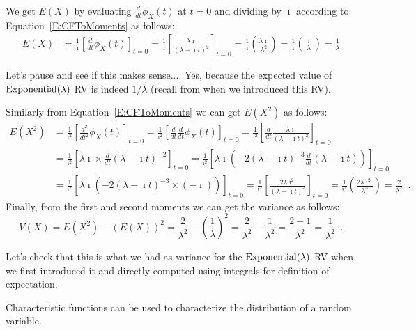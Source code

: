 \begin{example}
We get $E(X)$ by evaluating $\frac{d}{dt}\phi_X(t)$ at $t=0$ and dividing by $\imath$ according to Equation~\eqref{E:CFToMoments} as follows:
\begin{align*}
E(X)
&= \frac{1}{\imath} \left[ \frac{d}{dt}\phi_X(t) \right]_{t=0} 
= \frac{1}{\imath} \left[ \frac{\lambda \imath}{(\lambda-\imath t)^{2}} \right]_{t=0} 
= \frac{1}{\imath} \left( \frac{\lambda \imath}{\lambda^{2}} \right) 
= \frac{1}{\imath} \left( \frac{\imath}{\lambda} \right) 
=  \frac{1}{\lambda} 
\end{align*}

Let's pause and see if this makes sense.... Yes, because the expected value of $\mbox{{\rm Exponential}}(\lambda)$ RV is indeed $1/\lambda$ (recall from when we introduced this RV).

Similarly from Equation~\eqref{E:CFToMoments} we can get $E(X^2)$ as follows:
\begin{align*}
E(X^2)
&= \frac{1}{\imath^2} \left[ \frac{d^2}{dt^2}\phi_X(t) \right]_{t=0} 
= \frac{1}{\imath^2} \left[ \frac{d}{dt} \frac{d}{dt} \phi_X(t) \right]_{t=0} 
= \frac{1}{\imath^2} \left[ \frac{d}{dt} \frac{\lambda \imath}{(\lambda-\imath t)^{2}} \right]_{t=0} \\
&= \frac{1}{\imath^2} \left[ \lambda \imath \times \frac{d}{dt} {(\lambda-\imath t)^{-2}} \right]_{t=0} 
= \frac{1}{\imath^2} \left[ \lambda \imath \left( -2(\lambda-\imath t)^{-3} \frac{d}{dt} {(\lambda-\imath t)} \right) \right]_{t=0}\\ 
&= \frac{1}{\imath^2} \left[ \lambda \imath \left( -2(\lambda-\imath t)^{-3} \times (-\imath ) \right) \right]_{t=0}
= \frac{1}{\imath^2} \left[ \frac{2 \lambda \imath^2}{(\lambda-\imath t)^{3}} \right]_{t=0}
= \frac{1}{\imath^2} \left( \frac{2 \lambda \imath^2}{\lambda^{3}} \right) 
=  \frac{2}{\lambda^{2}}\enspace.
\end{align*}
Finally, from the first and second moments we can get the variance as follows:
\[
V(X) = E(X^2) - (E(X))^2 = \frac{2}{\lambda^2} - \left(\frac{1}{\lambda}\right)^2  = \frac{2}{\lambda^2} - \frac{1}{\lambda^2} = \frac{2-1}{\lambda^2} = \frac{1}{\lambda^2}   \enspace .
\]

Let's check that this is what we had as variance for the $\mbox{{\rm Exponential}}(\lambda)$ RV when we first introduced it and directly computed using integrals for definition of expectation.
\end{example}

Characteristic functions can be used to characterize the distribution of a random variable.

